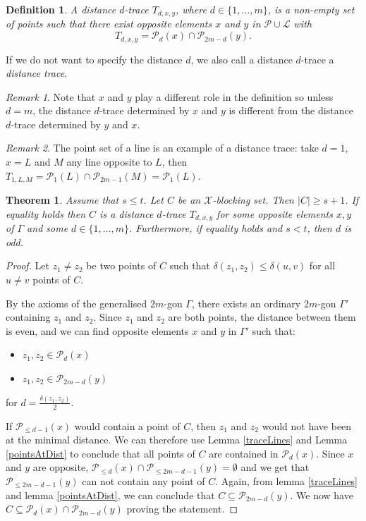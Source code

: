 \documentclass[12pt]{article}
\newcommand{\Points}{\mathcal{P}}
\newcommand{\Lines}{\mathcal{L}}
\newtheorem{theorem}{Theorem}
\newtheorem{definition}{Definition}
\theoremstyle{remark}
\newtheorem{remark}{Remark}
\begin{document}
\begin{definition}
	A {\em distance $d$-trace} \(T_{d,x,y}\), where \(d\in \{1,\dots,m\}\), is a non-empty set of points such that there exist opposite elements \(x\) and \(y\) in \(\Points\cup\Lines\) with 
	\[T_{d,x,y} = \Points_{d}(x)\cap\Points_{2m-d}(y).\]
\end{definition}
If we do not want to specify the distance $d$, we also call a distance $d$-trace a {\em distance trace}.
\begin{remark} Note that $x$ and $y$ play a different role in the definition so unless $d=m$, the distance $d$-trace determined by $x$ and $y$ is different from the distance $d$-trace determined by $y$ and $x$.
\end{remark}

\begin{remark} The point set of a line is an example of a distance trace: take $d=1$, $x=L$ and $M$ any line opposite to $L$, then $T_{1,L,M}=\Points_1(L)\cap \Points_{2m-1}(M)=\Points_1(L).$
\end{remark}
\begin{theorem}\label{distanceTraces}Assume that \(s\le t\).
Let $C$ be an $\mathcal{X}$-blocking set. Then $|C|\geq s+1$. If equality holds then $C$ is a distance $d$-trace $T_{d,x,y}$ for some opposite elements $x,y$ of $\Gamma$ and some $d\in \{1,\ldots,m\}$. 
 Furthermore, if equality holds and $s<t$, then $d$ is odd.
\end{theorem}
\begin{proof}
	Let \(z_1\neq z_2\) be two points of \(C\) such that $\delta(z_1,z_2)\leq 
    \delta(u,v)$ for all $u\neq v$ points of $C$.
    
    By the axioms of the generalised \(2m\)-gon $\Gamma$, there exists an ordinary \(2m\)-gon $\Gamma'$ containing \(z_1\) and \(z_2\). Since \(z_1\) and \(z_2\) are both points, the distance between them is even, and we can find opposite elements \(x\) and \(y\) in $\Gamma'$ such that:
	\begin{itemize}
		\item \(z_1,z_2 \in \Points_d(x)\)
		\item \(z_1,z_2 \in \Points_{2m-d}(y)\)
	\end{itemize}
	for \(d=\frac{\delta(z_1,z_2)}{2}\).
	
If \(\Points_{\le d-1}(x)\) would contain a point of \(C\), then \(z_1\) and \(z_2\) would not have been at the minimal distance. We can therefore use Lemma \ref{traceLines} and Lemma \ref{pointsAtDist} to conclude that all points of \(C\) are contained in \(\Points_{d}(x)\).
Since \(x\) and \(y\) are opposite, \(\Points_{\le d}(x)\cap \Points_{\le 2m-d-1}(y) = \emptyset\) and we get that \(\Points_{\le 2m-d-1}(y)\) can not contain any point of \(C\). Again, from lemma \ref{traceLines} and lemma \ref{pointsAtDist}, we can conclude that \(C\subseteq \Points_{2m-d}(y)\). 
We now have \(C\subseteq \Points_{d}(x)\cap\Points_{2m-d}(y)\) proving the statement.
\end{proof}
\end{document}
